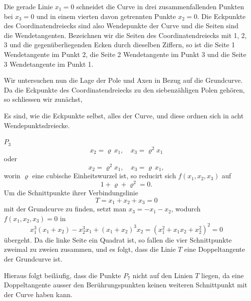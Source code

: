 Die gerade Linie $x_1 = 0$ schneidet die Curve in drei zusammenfallenden
Punkten bei $x_3 = 0$ und in einem vierten davon getrennten Punkte
$x_2 = 0$. Die Eckpunkte des Coordinatendreiecks sind also Wendepunkte
der Curve und die Seiten sind die Wendetangenten. Bezeichnen wir die
Seiten des Coordinatendreiecks mit 1, 2, 3 und die gegenüberliegenden
Ecken durch dieselben Ziffern, so ist die Seite 1 Wendetangente im
Punkt 2, die Seite 2 Wendetangente im Punkt 3 und die Seite 3
Wendetangente im Punkt 1.

Wir untersuchen nun die Lage der Pole und Axen in Bezug auf die
Grundcurve. Da die Eckpunkte des Coordinatendreiecks zu den
siebenzähligen Polen gehören, so schliessen wir zunächst,

Es sind, wie die Eckpunkte selbst, alles  der Curve, und
diese ordnen sich in acht Wendepunktsdreiecke.

 $P_3$ 
\[
x_2 = \varrho\,x_1, \quad x_3 = \varrho^2 x_1
\]
oder
\[
x_2 = \varrho^2 x_1, \quad x_3 = \varrho\,x_1,
\]
worin $\varrho$ eine cubische Einheitswurzel ist, so reducirt sich
$f(x_1, x_2, x_3)$ auf
\[
1 + \varrho + \varrho^2 = 0.
\]
Um die Schnittpunkte ihrer Verbindungslinie
\[
T = x_1 + x_2 + x_3 = 0
\]
mit der Grundcurve zu finden, setzt man $x_3 = -x_1 - x_2$, wodurch
$f(x_1, x_2, x_3) = 0$ in
\[
x_1^3(x_1+x_2) - x_2^3 x_1 + (x_1+x_2)^3 x_2 = (x_1^2+x_1x_2+x_2^2)^2 = 0
\]
übergeht. Da die linke Seite ein Quadrat ist, so fallen die vier
Schnittpunkte zweimal zu zweien zusammen, und es folgt, dass die
Linie $T$ eine Doppeltangente der Grundcurve ist.


Hieraus folgt beiläufig, dass die Punkte $P_7$ nicht auf den Linien
$T$ liegen, da eine Doppeltangente ausser den Berührungspunkten
keinen weiteren Schnittpunkt mit der Curve haben kann.

